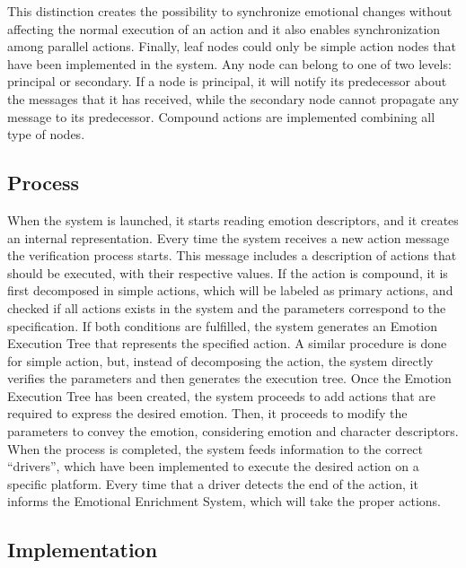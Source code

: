 \documentclass{sig-alternate-05-2015}
\begin{document}
This distinction creates the possibility to synchronize emotional changes without affecting the normal execution of an action and it also enables synchronization among parallel actions. Finally, leaf nodes could only be simple action nodes that have been implemented in the system. Any node can belong to one of two levels: principal or  secondary. If a node is principal, it will notify its predecessor about the messages that it has received, while the secondary node cannot propagate any message to its predecessor.%
Compound actions are implemented combining all type of nodes. 

\subsection{Process}

When the system is launched, it starts reading emotion descriptors, and it creates an internal representation. Every time the system receives a new action message the verification process starts. This message includes a description of actions that should be executed, with their respective values. If the action is compound, it is first decomposed in simple actions, which will be labeled as primary actions, and checked if all actions exists in the system and the parameters correspond to the specification. If both conditions are fulfilled, the system generates an Emotion Execution Tree that represents the specified action. A similar procedure is done for simple action, but, instead of decomposing the action, the system directly verifies the parameters and then generates the execution tree. Once the Emotion Execution Tree has been created, the system proceeds to add actions that are required to express the desired emotion. Then, it proceeds to modify the parameters to convey the emotion, considering emotion and character descriptors. When the process is completed, the system feeds information to the correct ``drivers'', which have been implemented to execute the desired action on a specific platform. Every time that a driver detects the end of the action, it informs the Emotional Enrichment System, which will take the proper actions.

\subsection{Implementation}
\end{document}
